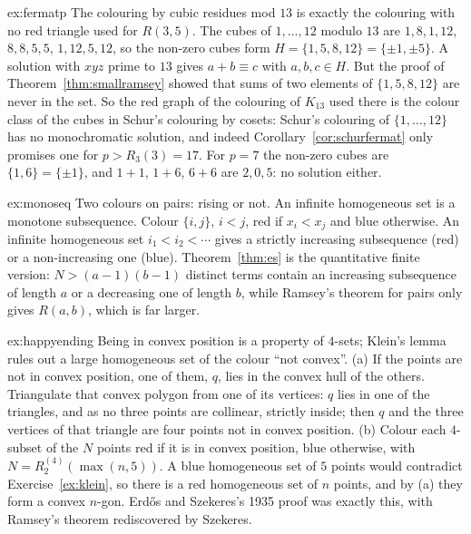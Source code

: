 \begin{solution}{ex:fermatp}
\idea The colouring by cubic residues mod $13$ is exactly the colouring with no red triangle used for $R(3,5)$.
\writeup The cubes of $1,\dots,12$ modulo $13$ are $1,8,1,12$, $8,8,5,5$, $1,12,5,12$, so the non-zero cubes form $H=\{1,5,8,12\}=\{\pm1,\pm5\}$. A solution with $xyz$ prime to $13$ gives $a+b\equiv c$ with $a,b,c\in H$. But
the proof of Theorem~\ref{thm:smallramsey} showed that sums of two elements of $\{1,5,8,12\}$ are never in the set. So the red graph of the colouring of $K_{13}$ used there is
the colour class of the cubes in Schur's colouring by cosets: Schur's colouring of $\{1,\dots,12\}$ has no monochromatic solution, and indeed Corollary~\ref{cor:schurfermat} only promises
one for $p>R_3(3)=17$. For $p=7$ the non-zero cubes are $\{1,6\}=\{\pm1\}$, and $1+1$, $1+6$, $6+6$ are $2,0,5$: no solution either.
\end{solution}

\begin{solution}{ex:monoseq}
\idea Two colours on pairs: rising or not. An infinite homogeneous set is a monotone subsequence.
\writeup Colour $\{i,j\}$, $i<j$, red if $x_i<x_j$ and blue otherwise. An infinite homogeneous set $i_1<i_2<\cdots$ gives a strictly increasing subsequence (red) or a non-increasing one (blue).
Theorem~\ref{thm:es} is the quantitative finite version: $N>(a-1)(b-1)$ distinct terms contain an increasing subsequence of length $a$ or a decreasing one of length $b$, while Ramsey's theorem for pairs only gives
$R(a,b)$, which is far larger.
\end{solution}

\begin{solution}{ex:happyending}
\idea Being in convex position is a property of $4$-sets; Klein's lemma rules out a large homogeneous set of the colour ``not convex''.
\writeup (a) If the points are not in convex position, one of them, $q$, lies in the convex hull of the others. Triangulate that convex polygon from one of its vertices: $q$ lies in one of the triangles,
and as no three points are collinear, strictly inside; then $q$ and the three vertices of that triangle are four points not in convex position.
(b) Colour each $4$-subset of the $N$ points red if it is in convex position, blue otherwise, with $N=R^{(4)}_2(\max(n,5))$. A blue homogeneous set of $5$ points would contradict Exercise~\ref{ex:klein}, so there is a red homogeneous set of $n$
points, and by (a) they form a convex $n$-gon. Erd\H os and Szekeres's 1935 proof was exactly this, with Ramsey's theorem rediscovered by Szekeres.
\end{solution}

